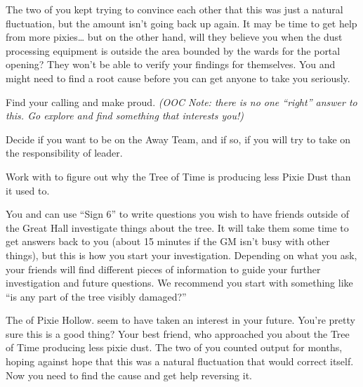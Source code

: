 \documentclass[char]{PP}
\begin{document}
The two of you kept trying to convince each other that this was just a natural fluctuation, but the amount isn’t going back up again. It may be time to get help from more pixies… but on the other hand, will they believe you when the dust processing equipment is outside the area bounded by the wards for the portal opening? They won’t be able to verify your findings for themselves. You and \cMTree{} might need to find a root cause before you can get anyone to take you seriously.
 

\begin{itemz}
	\item Find your calling and make \cSHead{} proud. \textit{(OOC Note: there is no one ``right'' answer to this. Go explore and find something that interests you!)}
	\item Decide if you want to be on the Away Team, and if so, if you will try to take on the responsibility of leader.
	\item Work with \cMTree{} to figure out why the Tree of Time is producing less Pixie Dust than it used to.
\end{itemz}

\begin{itemz}[Notes]
\item You and \cMTree{} can use ``Sign 6'' to write questions you wish to have friends outside of the Great Hall investigate things about the tree. It will take them some time to get answers back to you (about 15 minutes if the GM isn't busy with other things), but this is how you start your investigation. Depending on what you ask, your friends will find different pieces of information to guide your further investigation and future questions. We recommend you start with something like ``is any part of the tree visibly damaged?''
\end{itemz}

\begin{contacts}
	\contact{\cSHead{}} The \cSHead{\Majesty} of Pixie Hollow. \cSHead{\They} seem\cSHead{\plural} to have taken an interest in your future. You’re pretty sure this is a good thing?
	\contact{\cMTree{}} Your best friend, who approached you about the Tree of Time producing less pixie dust. The two of you counted output for months, hoping against hope that this was a natural fluctuation that would correct itself. Now you need to find the cause and get help reversing it.
\end{contacts}
\end{document}
